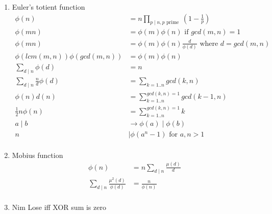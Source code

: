 \documentclass{article}
\begin{document}
\begin{enumerate}
\item Euler's totient function
\begin{align*}
	\phi(n) &= n \prod_{p \mid n, p \text{ prime }}{(1 - \frac{1}{p})} \\
	\phi(mn) &= \phi(m) \phi(n) \text{ if } gcd(m, n) = 1 \\
	\phi(mn) &= \phi(m) \phi(n) \frac{d}{\phi(d)} \text{ where } d = gcd(m, n) \\
	\phi(lcm(m,n)) \phi(gcd(m,n)) &= \phi(m) \phi(n) \\
	\sum_{d \mid n}{\phi(d)} &= n \\
	\sum_{d \mid n}{\frac{n}{d} \phi(d)} &= \sum_{k=1..n}{gcd(k, n)} \\
	\phi(n) d(n) &= \sum_{k=1..n}^{gcd(k,n)=1}{gcd(k-1, n)} \\
	\frac{1}{2} n \phi(n) &= \sum_{k=1..n}^{gcd(k,n)=1}{k} \\
	a \mid b &\rightarrow \phi(a) \mid \phi(b) \\
	n &\mid \phi(a^n - 1) \text{ for } a,n > 1 \\
\end{align*}

\item Mobius function
\begin{align*}
	\phi(n) &= n \sum_{d \mid n}{\frac{\mu(d)}{d}} \\
	\sum_{d \mid n}{\frac{\mu^2(d)}{\phi(d)}} &= \frac{n}{\phi(n)} \\
\end{align*}

\item Nim
Lose iff XOR sum is zero

\end{enumerate}
\end{document}
